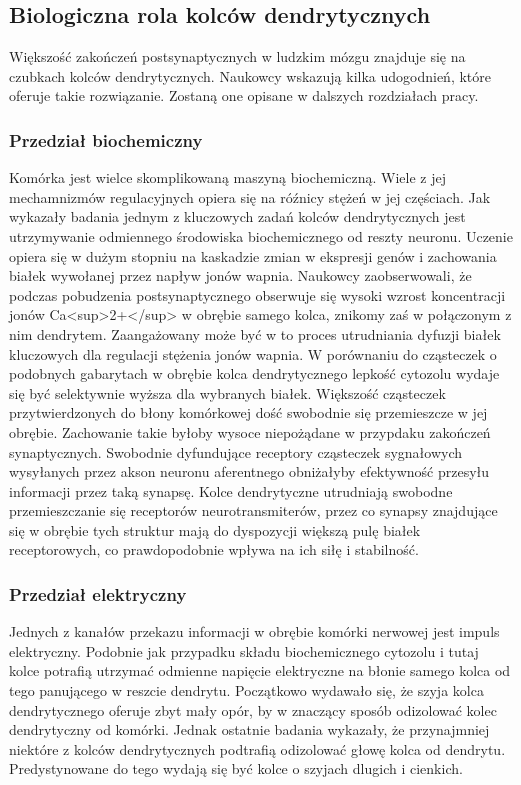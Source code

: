 \documentclass{article}
\begin{document}
\subsection{Biologiczna rola kolców dendrytycznych}
Większość zakończeń postsynaptycznych %
w ludzkim mózgu znajduje się na czubkach kolców dendrytycznych.
Naukowcy wskazują kilka udogodnień, które oferuje takie rozwiązanie.
Zostaną one opisane w dalszych rozdziałach pracy.
\subsubsection{Przedział biochemiczny}
Komórka jest wielce skomplikowaną maszyną biochemiczną. 
Wiele z jej mechamnizmów regulacyjnych opiera się na róźnicy stężeń w jej częściach. 
Jak wykazały badania %
jednym z kluczowych zadań kolców dendrytycznych jest utrzymywanie odmiennego środowiska biochemicznego od reszty neuronu.
Uczenie opiera się w dużym stopniu na kaskadzie zmian w ekspresji genów i zachowania białek wywołanej przez napływ jonów wapnia.
Naukowcy zaobserwowali, że podczas pobudzenia postsynaptycznego obserwuje się wysoki wzrost koncentracji jonów Ca<sup>{2+}</sup> w obrębie samego kolca, znikomy zaś w połączonym z nim dendrytem.
Zaangażowany może być w to proces utrudniania dyfuzji białek kluczowych dla regulacji stężenia jonów wapnia.
W porównaniu do cząsteczek o podobnych gabarytach w obrębie kolca dendrytycznego lepkość cytozolu wydaje się być selektywnie wyższa dla wybranych białek.
Większość cząsteczek przytwierdzonych do błony komórkowej dość swobodnie się przemieszcze w jej obrębie. 
Zachowanie takie byłoby wysoce niepożądane w przypdaku zakończeń synaptycznych. 
Swobodnie dyfundujące receptory cząsteczek sygnałowych wysyłanych przez akson neuronu aferentnego obniżałyby efektywność przesyłu informacji przez taką synapsę. 
Kolce dendrytyczne utrudniają swobodne przemieszczanie się receptorów neurotransmiterów, przez co synapsy znajdujące się w obrębie tych struktur mają do dyspozycji większą pulę białek receptorowych, co prawdopodobnie wpływa na ich siłę i stabilność. 

\subsubsection{Przedział elektryczny}
Jednych z kanałów przekazu informacji w obrębie komórki nerwowej jest impuls elektryczny.
Podobnie jak przypadku składu biochemicznego cytozolu i tutaj kolce potrafią utrzymać odmienne napięcie elektryczne na błonie samego kolca od tego panującego w reszcie dendrytu.
Początkowo wydawało się, że szyja kolca dendrytycznego oferuje zbyt mały opór, by w znaczący sposób odizolować kolec dendrytyczny od komórki. 
Jednak ostatnie badania wykazały, że przynajmniej niektóre z kolców dendrytycznych podtrafią odizolować głowę kolca od dendrytu.
Predystynowane do tego wydają się być kolce o szyjach dlugich i cienkich.
\end{document}
